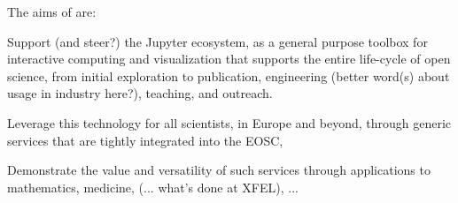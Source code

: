 

The aims of \TheProject are:
\begin{compactenum}
\item \label{aim:jupyter}%
  Support (and steer?) the Jupyter ecosystem, as a general purpose
  toolbox for interactive computing and visualization that supports
  the entire life-cycle of open science, from initial exploration to
  publication, engineering (better word(s) about usage in industry
  here?), teaching, and outreach.

\item \label{aim:services}%
  Leverage this technology for all scientists, in Europe and beyond,
  through generic services that are tightly integrated into the EOSC,

\item \label{aim:demonstrators}%
  Demonstrate the value and versatility of such services through
  applications to mathematics, medicine, (... what's done at XFEL),
  ...
\end{compactenum}

